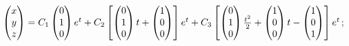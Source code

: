 \begin{enumsolsfull}
		\label{sol:linsys_hmg:simple3d}
		\item \( \begin{pmatrix} x \\ y \\ z \end{pmatrix} = C_1 \begin{pmatrix} 0 \\ 1 \\ 0 \end{pmatrix} e^{t} + C_2 \left[ \begin{pmatrix} 0 \\ 1 \\ 0 \end{pmatrix} t + \begin{pmatrix} 1 \\ 0 \\ 0 \end{pmatrix} \right] e^{t} + C_3 \left[ \begin{pmatrix} 0 \\ 1 \\ 0 \end{pmatrix} \frac{t^2}{2} + \begin{pmatrix} 1 \\ 0 \\ 0 \end{pmatrix} t - \begin{pmatrix} 1 \\ 0 \\ 1 \end{pmatrix} \right] e^{t} \); %

\end{enumsolsfull}
